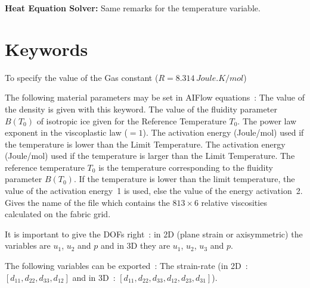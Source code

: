 \noindent \textbf{Heat Equation Solver:} Same remarks for the temperature variable.


 \section{Keywords}

 \sifbegin {} \sifbegin {}
 To specify the value of the Gas constant ($R=8.314\,Joule.K/mol$)
%
 \sifend


 The following material parameters may be set in AIFlow equations~:
%
 \sifbegin
%
%
 The value of the density is given with this keyword.
%
%
 The value of the fluidity parameter $B(T_0)$ of isotropic ice given for the
 Reference Temperature $T_0$.
%
%
 The power law exponent in the viscoplastic law ($=1$).
%
%
 The activation energy (Joule/mol) used if the temperature is lower than the Limit
 Temperature.
%
%
 The activation energy (Joule/mol) used if the temperature is larger than the Limit
 Temperature.
%
%
 The reference temperature $T_0$ is the temperature corresponding to the  fluidity
 parameter $B(T_0)$.
%
%
 If the temperature is lower than the limit temperature, the value of the activation
 energy~1 is used, else the value of the energy activation~2.
%
%
 Gives the name of the file which contains the $813 \times 6$ relative viscosities
 calculated on the fabric grid.
 \sifend



\sifbegin
%


%
It is important to give the DOFs right~: in 2D (plane strain or axisymmetric) the variables are  $u_1$, $u_2$ and $p$
and in 3D they are $u_1$, $u_2$, $u_3$ and $p$.



  \sifend
 The following variables can be exported~:
 \sifbegin
%
 The strain-rate (in 2D~: $[d_{11}, d_{22}, d_{33},
d_{12}]$ and in 3D~: $[d_{11}, d_{22}, d_{33}, d_{12}, d_{23}, d_{31}]$).
 \sifend

